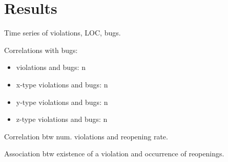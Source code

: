 \section{Results}

Time series of violations, LOC, bugs.

Correlations with bugs:

\begin{itemize}
  \item violations and bugs: n
  \item x-type violations and bugs: n
  \item y-type violations and bugs: n
  \item z-type violations and bugs: n
\end{itemize}

Correlation btw num. violations and reopening rate.

Association btw existence of a violation and occurrence of reopenings.